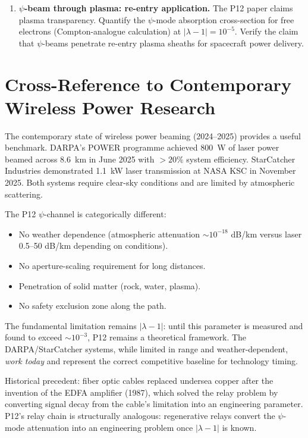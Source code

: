 \documentclass[aps,prd,twocolumn,superscriptaddress]{revtex4-2}
\begin{document}
\begin{enumerate}
\item \textbf{$\psi$-beam through plasma: re-entry application.}
The P12 paper claims plasma transparency.  Quantify the $\psi$-mode
absorption cross-section for free electrons (Compton-analogue calculation)
at $|\lambda-1| = 10^{-5}$.  Verify the claim that $\psi$-beams
penetrate re-entry plasma sheaths for spacecraft power delivery.

\end{enumerate}

\section{Cross-Reference to Contemporary Wireless Power Research}
\label{sec:contemporary}

The contemporary state of wireless power beaming (2024--2025) provides
a useful benchmark.  DARPA's POWER programme achieved 800~W of laser
power beamed across 8.6~km in June 2025 with $>20\%$ system efficiency.
StarCatcher Industries demonstrated 1.1~kW laser transmission at NASA KSC
in November 2025.  Both systems require clear-sky conditions and are
limited by atmospheric scattering.

The P12 $\psi$-channel is categorically different:
\begin{itemize}
\item No weather dependence (atmospheric attenuation $\sim 10^{-18}$ dB/km
versus laser 0.5--50 dB/km depending on conditions).
\item No aperture-scaling requirement for long distances.
\item Penetration of solid matter (rock, water, plasma).
\item No safety exclusion zone along the path.
\end{itemize}

The fundamental limitation remains $|\lambda-1|$: until this parameter
is measured and found to exceed $\sim 10^{-3}$, P12 remains a theoretical
framework.  The DARPA/StarCatcher systems, while limited in range and
weather-dependent, \emph{work today} and represent the correct competitive
baseline for technology timing.

Historical precedent: fiber optic cables replaced undersea copper after
the invention of the EDFA amplifier (1987), which solved the relay problem
by converting signal decay from the cable's limitation into an engineering
parameter.  P12's relay chain is structurally analogous: regenerative
relays convert the $\psi$-mode attenuation into an engineering problem
once $|\lambda-1|$ is known.
\end{document}
